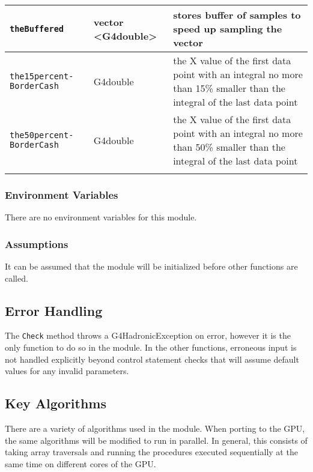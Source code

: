 \documentclass[12pt]{article}
\newcommand{\todo}[1]{\textcolor{red}{[TODO: #1]}} \else
\newcommand{\authornote}[3]{} \newcommand{\todo}[1]{} \fi
\newcommand{\mmp}[1]{\authornote{green}{MP}{#1}}
\begin{document}
\begin{table}[h]
\begin{tabularx}{\textwidth}{p{}p{}p{}}
\texttt{theBuffered} & vector \textless G4double\textgreater & stores buffer of samples to speed up sampling the vector \\\hline
\texttt{the15percent- BorderCash} & G4double & the X value of the first data point with an integral no more than 15\% smaller than the integral of the last data point \\\hline
\texttt{the50percent- BorderCash} & G4double & the X value of the first data point with an integral no more than 50\% smaller than the integral of the last data point\\
\arrayrulecolor{black}
\bottomrule
\end{tabularx}
\end{table}
\clearpage
\mmp{no longer use theHash since it was a object used to speed up cpu computions, which has been ported to GPU}
\subsubsection{Environment Variables}%
There are no environment variables for this module.

\subsubsection{Assumptions}%
It can be assumed that the module will be initialized before other functions are called.

\subsection{Error Handling}
The \texttt{Check} method throws a G4HadronicException on error, however it is the only function to do so in the module. In the other functions, erroneous input is not handled explicitly beyond control statement checks that will assume default values for any invalid parameters.

\subsection{Key Algorithms}
There are a variety of algorithms used in the module. When porting to the GPU, the same algorithms will be modified to run in parallel. In general, this consists of taking array traversals and running the procedures executed sequentially at the same time on different cores of the GPU. 

\end{document}
